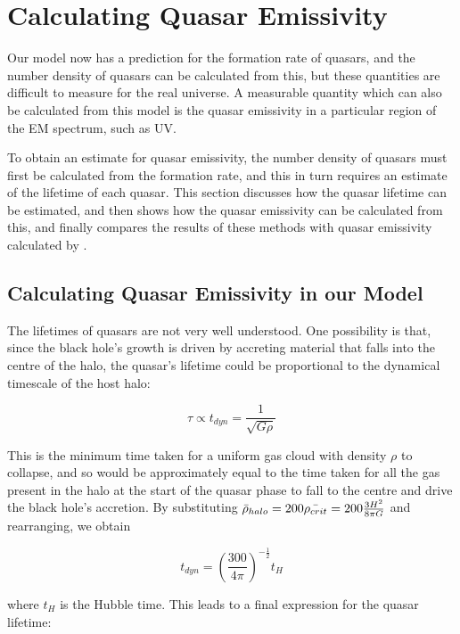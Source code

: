 \documentclass[12pt, twocolumn]{article}%
\begin{document}
\section{Calculating Quasar Emissivity}

Our model now has a prediction for the formation rate of quasars, and the number density of quasars can be calculated from this, but these quantities are difficult to measure for the real universe. A measurable quantity which can also be calculated from this model is the quasar emissivity in a particular region of the EM spectrum, such as UV.\par

To obtain an estimate for quasar emissivity, the number density of quasars must first be calculated from the formation rate, and this in turn requires an estimate of the lifetime of each quasar. This section discusses how the quasar lifetime can be estimated, and then shows how the quasar emissivity can be calculated from this, and finally compares the results of these methods with quasar emissivity calculated by \cite{Haardt_Madau}.

\subsection{Calculating Quasar Emissivity in our Model}

The lifetimes of quasars are not very well understood. One possibility is that, since the black hole’s growth is driven by accreting material that falls into the centre of the halo, the quasar’s lifetime could be proportional to the dynamical timescale of the host halo:

\begin{equation}
    \tau\propto t_{dyn}=\frac{1}{\sqrt{G\rho}}
\end{equation}

\noindent This is the minimum time taken for a uniform gas cloud with density $\rho$ to collapse, and so would be approximately equal to the time taken for all the gas present in the halo at the start of the quasar phase to fall to the centre and drive the black hole’s accretion. By substituting $\Bar{\rho}_{halo}=200\Bar{\rho_{crit}}=200\frac{3H^2}{8\pi G}$ and rearranging, we obtain

\begin{equation}
    t_{dyn}=\left(\frac{300}{4\pi}\right)^{-\frac{1}{2}}t_H
\end{equation}

\noindent where $t_H$ is the Hubble time. This leads to a final expression for the quasar lifetime:
\end{document}
